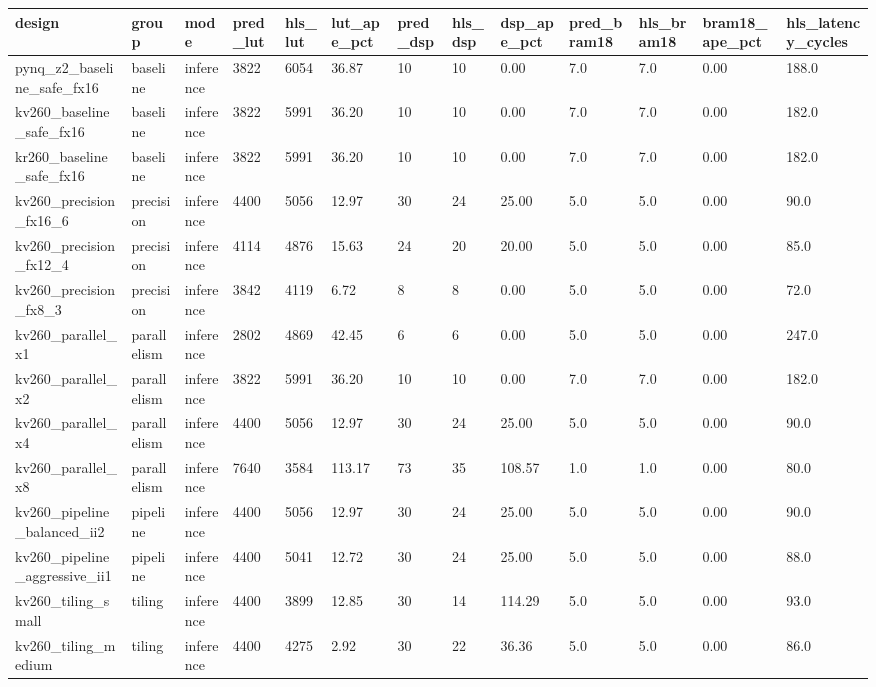 \begin{table}[t]
\centering
\scriptsize
\setlength{\tabcolsep}{3pt}
\begin{tabular}{lllllllllllll}
\hline
design & group & mode & pred\_lut & hls\_lut & lut\_ape\_pct & pred\_dsp & hls\_dsp & dsp\_ape\_pct & pred\_bram18 & hls\_bram18 & bram18\_ape\_pct & hls\_latency\_cycles \\
\hline
pynq\_z2\_baseline\_safe\_fx16 & baseline & inference & 3822 & 6054 & 36.87 & 10 & 10 & 0.00 & 7.0 & 7.0 & 0.00 & 188.0 \\
kv260\_baseline\_safe\_fx16 & baseline & inference & 3822 & 5991 & 36.20 & 10 & 10 & 0.00 & 7.0 & 7.0 & 0.00 & 182.0 \\
kr260\_baseline\_safe\_fx16 & baseline & inference & 3822 & 5991 & 36.20 & 10 & 10 & 0.00 & 7.0 & 7.0 & 0.00 & 182.0 \\
kv260\_precision\_fx16\_6 & precision & inference & 4400 & 5056 & 12.97 & 30 & 24 & 25.00 & 5.0 & 5.0 & 0.00 & 90.0 \\
kv260\_precision\_fx12\_4 & precision & inference & 4114 & 4876 & 15.63 & 24 & 20 & 20.00 & 5.0 & 5.0 & 0.00 & 85.0 \\
kv260\_precision\_fx8\_3 & precision & inference & 3842 & 4119 & 6.72 & 8 & 8 & 0.00 & 5.0 & 5.0 & 0.00 & 72.0 \\
kv260\_parallel\_x1 & parallelism & inference & 2802 & 4869 & 42.45 & 6 & 6 & 0.00 & 5.0 & 5.0 & 0.00 & 247.0 \\
kv260\_parallel\_x2 & parallelism & inference & 3822 & 5991 & 36.20 & 10 & 10 & 0.00 & 7.0 & 7.0 & 0.00 & 182.0 \\
kv260\_parallel\_x4 & parallelism & inference & 4400 & 5056 & 12.97 & 30 & 24 & 25.00 & 5.0 & 5.0 & 0.00 & 90.0 \\
kv260\_parallel\_x8 & parallelism & inference & 7640 & 3584 & 113.17 & 73 & 35 & 108.57 & 1.0 & 1.0 & 0.00 & 80.0 \\
kv260\_pipeline\_balanced\_ii2 & pipeline & inference & 4400 & 5056 & 12.97 & 30 & 24 & 25.00 & 5.0 & 5.0 & 0.00 & 90.0 \\
kv260\_pipeline\_aggressive\_ii1 & pipeline & inference & 4400 & 5041 & 12.72 & 30 & 24 & 25.00 & 5.0 & 5.0 & 0.00 & 88.0 \\
kv260\_tiling\_small & tiling & inference & 4400 & 3899 & 12.85 & 30 & 14 & 114.29 & 5.0 & 5.0 & 0.00 & 93.0 \\
kv260\_tiling\_medium & tiling & inference & 4400 & 4275 & 2.92 & 30 & 22 & 36.36 & 5.0 & 5.0 & 0.00 & 86.0 \\

\end{tabular}
\end{table}
